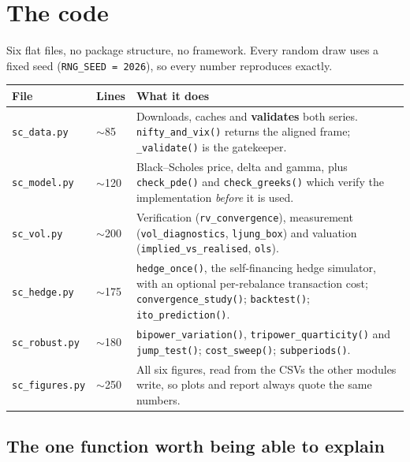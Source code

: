 \documentclass[11pt,a4paper]{article}
\begin{document}
\section{The code}

Six flat files, no package structure, no framework. Every random draw uses a fixed seed
(\texttt{RNG\_SEED = 2026}), so every number reproduces exactly.

\begin{table}[H]
\centering\small
\begin{tabular}{L{2.6cm}L{2.0cm}L{9.9cm}}
\toprule
\textbf{File} & \textbf{Lines} & \textbf{What it does} \\
\midrule
\texttt{sc\_data.py} & $\sim$85 & Downloads, caches and \textbf{validates} both series.
\texttt{nifty\_and\_vix()} returns the aligned frame; \texttt{\_validate()} is the gatekeeper. \\
\texttt{sc\_model.py} & $\sim$120 & Black--Scholes price, delta and gamma, plus
\texttt{check\_pde()} and \texttt{check\_greeks()} which verify the implementation \emph{before}
it is used. \\
\texttt{sc\_vol.py} & $\sim$200 & Verification (\texttt{rv\_convergence}), measurement
(\texttt{vol\_diagnostics}, \texttt{ljung\_box}) and valuation
(\texttt{implied\_vs\_realised}, \texttt{ols}). \\
\texttt{sc\_hedge.py} & $\sim$175 & \texttt{hedge\_once()}, the self-financing hedge
simulator, with an optional per-rebalance transaction cost; \texttt{convergence\_study()};
\texttt{backtest()}; \texttt{ito\_prediction()}. \\
\texttt{sc\_robust.py} & $\sim$180 & \texttt{bipower\_variation()},
\texttt{tripower\_quarticity()} and \texttt{jump\_test()}; \texttt{cost\_sweep()};
\texttt{subperiods()}. \\
\texttt{sc\_figures.py} & $\sim$250 & All six figures, read from the CSVs the other modules
write, so plots and report always quote the same numbers. \\
\bottomrule
\end{tabular}
\end{table}

\subsection{The one function worth being able to explain}
\end{document}
